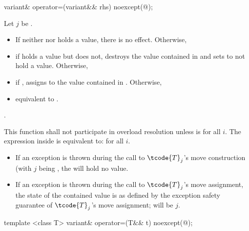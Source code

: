 %
\begin{itemdecl}
variant& operator=(variant&& rhs) noexcept(@\seebelow@);
\end{itemdecl}

\begin{itemdescr}
\pnum
Let $j$ be .

\pnum
\effects
\begin{itemize}
\item
If neither  nor  holds a value, there is no effect. Otherwise,
\item
if  holds a value but  does not, destroys the value
contained in  and sets  to not hold a value. Otherwise,
\item
if , assigns  to
the value contained in . Otherwise,
\item
equivalent to .
\end{itemize}

\pnum
\returns {}.

\pnum
\remarks
This function shall not participate in overload resolution unless
 is
 for all $i$.
The expression inside  is equivalent to:
 for all $i$.
\begin{itemize}
\item If an exception is thrown during the call to $\tcode{T}_j$'s move construction
(with $j$ being , the  will hold no value.
\item If an exception is thrown during the call to $\tcode{T}_j$'s move assignment,
the state of the contained value is as defined by the exception safety
guarantee of $\tcode{T}_j$'s move assignment;  will be $j$.
\end{itemize}
\end{itemdescr}

%
\begin{itemdecl}
template <class T> variant& operator=(T&& t) noexcept(@\seebelow@);
\end{itemdecl}

